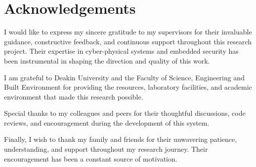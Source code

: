 \chapter*{Acknowledgements}

I would like to express my sincere gratitude to my supervisors for their invaluable guidance, constructive feedback, and continuous support throughout this research project. Their expertise in cyber-physical systems and embedded security has been instrumental in shaping the direction and quality of this work.

I am grateful to Deakin University and the Faculty of Science, Engineering and Built Environment for providing the resources, laboratory facilities, and academic environment that made this research possible.

Special thanks to my colleagues and peers for their thoughtful discussions, code reviews, and encouragement during the development of this system.

Finally, I wish to thank my family and friends for their unwavering patience, understanding, and support throughout my research journey. Their encouragement has been a constant source of motivation.
